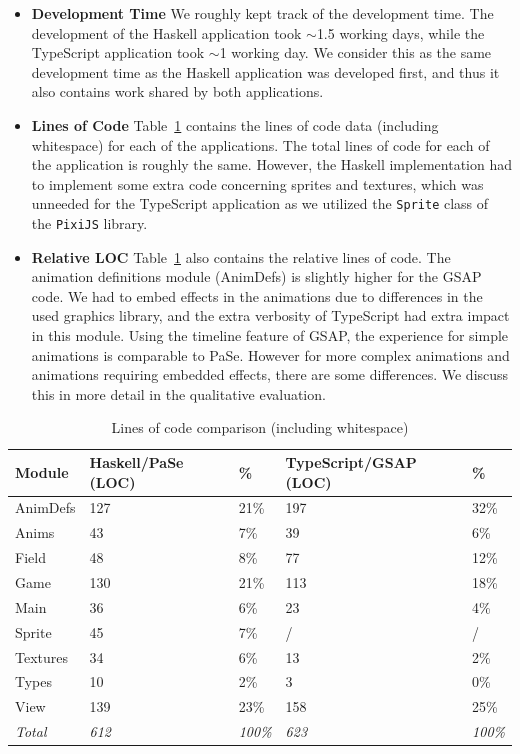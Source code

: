 \begin{itemize}
\item \textbf{Development Time} We roughly kept track of the development time. The development of the Haskell application took $\sim$1.5 working days, while the TypeScript application took $\sim$1 working day. We consider this as the same development time as the Haskell application was developed first, and thus it also contains work shared by both applications.
\item \textbf{Lines of Code} Table~\ref{tbl:loc} contains the lines of code data (including whitespace) for each of the applications. The total lines of code for each of the application is roughly the same. However, the Haskell implementation had to implement some extra code concerning sprites and textures, which was unneeded for the TypeScript application as we utilized the \texttt{Sprite} class of the \texttt{PixiJS} library.
\item \textbf{Relative LOC} Table~\ref{tbl:loc} also contains the relative lines of code. The animation definitions module (AnimDefs) is slightly higher for the GSAP code. We had to embed effects in the animations due to differences in the used graphics library, and the extra verbosity of TypeScript had extra impact in this module. Using the timeline feature of GSAP, the experience for simple animations is comparable to PaSe. However for more complex animations and animations requiring embedded effects, there are some differences. We discuss this in more detail in the qualitative evaluation.
\end{itemize}

\begin{table}[t!]
\caption{Lines of code comparison (including whitespace)}
\centering
\label{tbl:loc}
\begin{center}
\begin{tabular}{l@{\hskip 0.5cm}ll@{\hskip 0.2cm}ll}
 Module & Haskell/PaSe (LOC) & \% & TypeScript/GSAP (LOC) & \% \\
 \hline
 AnimDefs & 127 & 21\% & 197 & 32\% \\ 
 Anims & 43 & 7\% & 39 & 6\% \\  
 Field & 48 & 8\% & 77 & 12\% \\  
 Game & 130 & 21\% & 113 & 18\% \\  
 Main & 36 & 6\% & 23 & 4\% \\  
 Sprite & 45 & 7\% & / & / \\  
 Textures & 34 & 6\% & 13 & 2\% \\  
 Types & 10 & 2\% & 3 & 0\% \\  
 View & 139 & 23\% & 158 & 25\% \\
 \emph{Total} & \emph{612} & \emph{100\%} & \emph{623} & \emph{100\%}
\end{tabular}
\end{center}
\end{table}

